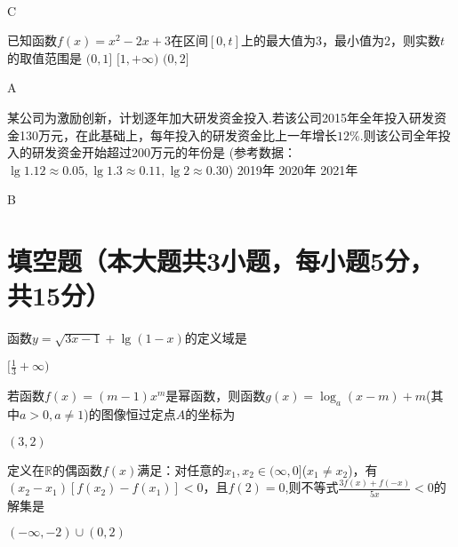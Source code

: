 \begin{exercise}
\\
\begin{answer}
  C
\end{answer}
\item
已知函数$f(x)=x^2-2x+3$在区间$[0,t]$上的最大值为3，最小值为2，则实数$t$的取值范围是\xz
  \xx{$[1,2]$}
  {$(0,1]$}
  {$[1,+\infty)$}
  {$(0,2]$}
\begin{answer}
  A
\end{answer}
\item
某公司为激励创新，计划逐年加大研发资金投入.若该公司2015年全年投入研发资金130万元，在此基础上，每年投入的研发资金比上一年增长$12\%$.则该公司全年投入的研发资金开始超过200万元的年份是
(参考数据：$\lg1.12\approx0.05,\lg1.3\approx0.11,\lg2\approx0.30$)\xz
  {2019年}
  {2020年}
  {2021年}
\begin{answer}
  B
\end{answer}
\par
\section{填空题（本大题共3小题，每小题5分，共15分）}
\item
 函数$y=\sqrt{3x-1}+\lg(1-x)$的定义域是\tk
\begin{answer}
  $[\frac13 +\infty)$
\end{answer}
\item
 若函数$f(x)=(m-1)x^m$是幂函数，则函数$g(x)=\log_a(x-m)+m$(其中$a>0,a\neq 1$)的图像恒过定点$A$的坐标为\tk
 \begin{answer}
   $(3,2)$
 \end{answer}
\item
 定义在$\mathbb{R}$的偶函数$f(x)$满足：对任意的$x_1,x_2\in(\infty,0]$($x_1\neq x_2$)，有
$(x_2-x_1)[f(x_2)-f(x_1)]<0$，且$f(2)=0$,则不等式$\frac{3f(x)+f(-x)}{5x}<0$的解集是\tk
\begin{answer}
  $(-\infty,-2)\cup (0,2)$
\end{answer}

\end{exercise}
